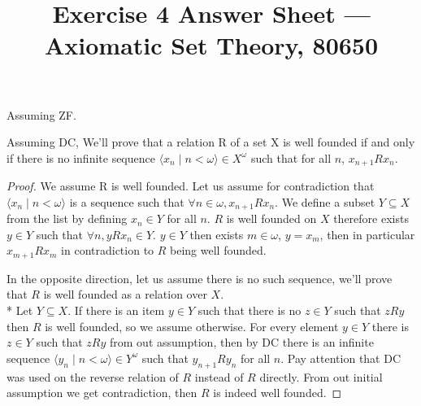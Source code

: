 
\title{Exercise 4 Answer Sheet --- Axiomatic Set Theory, 80650}


\maketitle
\maketitleprint{}

\question{}
Assuming ZF.\@

\subquestion{}
Assuming DC, We'll prove that a relation R of a set X is well founded if and only if there is no infinite sequence $\langle x_n \mid n < \omega \rangle \in X^\omega$ such that for all $n$, $x_{n + 1} R x_n$.
\begin{proof}
	We assume R is well founded.
	Let us assume for contradiction that $\langle x_n \mid n < \omega \rangle$ is a sequence such that $\forall n \in \omega, x_{n + 1} R x_n$.
	We define a subset $Y \subseteq X$ from the list by defining $x_n \in Y$ for all $n$. $R$ is well founded on $X$ therefore exists $y \in Y$ such that $\forall n, y R x_n \in Y$.
	$y \in Y$ then exists $m \in \omega$, $y = x_m$, then in particular $x_{m + 1} R x_m$ in contradiction to $R$ being well founded.

	In the opposite direction, let us assume there is no such sequence, we'll prove that $R$ is well founded as a relation over $X$. \\*
	Let $Y \subseteq X$. If there is an item $y \in Y$ such that there is no $z \in Y$ such that $z R y$ then $R$ is well founded, so we assume otherwise.
	For every element $y \in Y$ there is $z \in Y$ such that $z R y$ from out assumption, then by DC there is an infinite sequence $\langle y_n \mid n < \omega \rangle \in Y^\omega$ such that $y_{n + 1} R y_n$ for all $n$.
	Pay attention that DC was used on the reverse relation of $R$ instead of $R$ directly.
	From out initial assumption we get contradiction, then $R$ is indeed well founded.
\end{proof}


